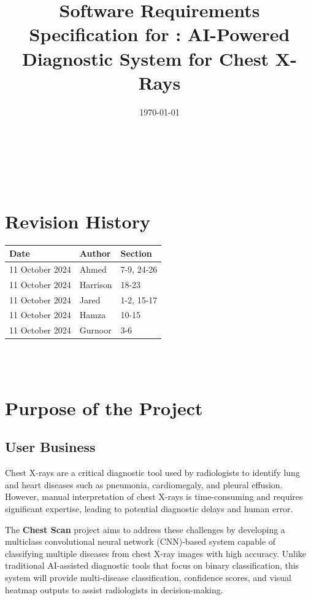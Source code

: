 \documentclass[12pt]{article}
\begin{document}
\title{Software Requirements Specification for \progname{}: AI-Powered Diagnostic System for Chest X-Rays} %
\author{\authname}
\date{\today}

\maketitle
{}

~\newpage

\tableofcontents %

~\newpage

\section*{Revision History}

\begin{tabularx}{\textwidth}{p{3cm}p{2cm}X}
\toprule {\textbf{Date}} & {Author} & {Section}\\
\midrule
11 October 2024 & Ahmed & 7-9, 24-26 \\
11 October 2024 & Harrison & 18-23 \\
11 October 2024 & Jared & 1-2, 15-17 \\
11 October 2024 & Hamza & 10-15 \\
11 October 2024 & Gurnoor & 3-6 \\
\bottomrule
\end{tabularx}

~\\

~\newpage
\section{Purpose of the Project}

\subsection{User Business}
Chest X-rays are a critical diagnostic tool used by radiologists to identify lung and heart diseases such as pneumonia, cardiomegaly, and pleural effusion. However, manual interpretation of chest X-rays is time-consuming and requires significant expertise, leading to potential diagnostic delays and human error.

The \textbf{Chest Scan} project aims to address these challenges by developing a multiclass convolutional neural network (CNN)-based system capable of classifying multiple diseases from chest X-ray images with high accuracy. Unlike traditional AI-assisted diagnostic tools that focus on binary classification, this system will provide multi-disease classification, confidence scores, and visual heatmap outputs to assist radiologists in decision-making.
\end{document}

